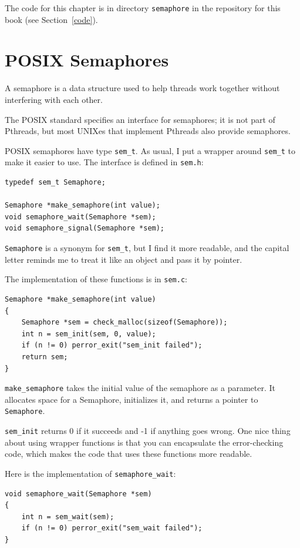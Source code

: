 \documentclass[12pt]{book}
\begin{document}
{The code for this chapter is in directory {\tt semaphore} in the
repository for this book (see Section~\ref{code}).


\section{POSIX Semaphores}

A semaphore is a data structure used to help threads work together
without interfering with each other.

The POSIX standard specifies an interface for semaphores;
it is not part of Pthreads, but most UNIXes
that implement Pthreads also provide semaphores.

POSIX semaphores have type {\tt sem\_t}.
As usual, I put a wrapper around {\tt sem\_t}
to make it easier to use.  The interface is defined in {\tt sem.h}:

\begin{verbatim}
typedef sem_t Semaphore;

Semaphore *make_semaphore(int value);
void semaphore_wait(Semaphore *sem);
void semaphore_signal(Semaphore *sem);
\end{verbatim}

{\tt Semaphore} is a synonym for \verb"sem_t", but I find it more
readable, and the capital letter reminds me to treat it like an
object and pass it by pointer.

The implementation of these functions is in {\tt sem.c}:

\begin{verbatim}
Semaphore *make_semaphore(int value)
{
    Semaphore *sem = check_malloc(sizeof(Semaphore));
    int n = sem_init(sem, 0, value);
    if (n != 0) perror_exit("sem_init failed");
    return sem;
}
\end{verbatim}

{\tt make\_semaphore} takes the initial value of the semaphore
as a parameter.  It allocates space for a Semaphore, initializes
it, and returns a pointer to {\tt Semaphore}.

{\tt sem\_init} returns 0 if it succeeds and -1 if anything goes
wrong.  One nice thing about using wrapper functions is that you can
encapsulate the error-checking code, which makes the code that uses
these functions more readable.

Here is the implementation of \verb"semaphore_wait":

\begin{verbatim}
void semaphore_wait(Semaphore *sem)
{
    int n = sem_wait(sem);
    if (n != 0) perror_exit("sem_wait failed");
}
\end{verbatim}

}
\end{document}
